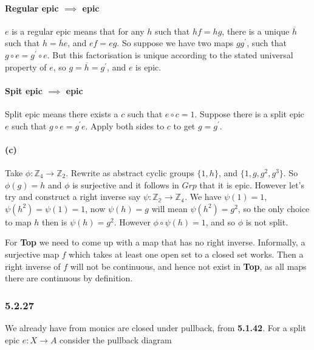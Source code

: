 \documentclass{article}
\begin{document}
\paragraph{Regular epic $\implies$ epic}

$e$ is a regular epic means that for any $h$ such that $hf = hg$, there is a unique $\overline{h}$ such that $h = \overline{h}e$, and $ef = eg$. So suppose we have two maps $g g^\prime$, such that $g\circ e = g^\prime \circ e$. But this factorisation is unique according to the stated universal property of $e$, so $g = \overline{h} = g^\prime$, and $e$ is epic.

\paragraph{Spit epic $\implies$ epic}

Split epic means there exists a $c$ such that $e \circ c=1$. Suppose there is a split epic $e$ such that $g \circ e = g^\prime e$. Apply both sides to $c$ to get $g = g^\prime$.

\paragraph{(c)}

Take $\phi\colon \mathds{Z}_4 \rightarrow \mathds{Z}_2$. Rewrite as abstract cyclic groups $\{1, h\}$, and $\{1, g, g^2, g^3\}$. So $\phi(g)=h$ and $\phi$ is surjective and it follows in $Grp$ that it is epic. However let's try and construct a right inverse say $\psi: \mathds{Z_2} \rightarrow \mathds{Z_4}$. We have $\psi(1)=1$, $\psi(h^2)=\psi(1)=1$, now $\psi(h)=g$ will mean $\psi(h^2) = g^2$, so the only choice to map $h$ then is $\psi(h)=g^2$.  However $\phi \circ \psi (h) = 1$, and so $\phi$ is not split.

For \textbf{Top} we need to come up with a map that has no right inverse. Informally, a surjective map $f$ which takes at least one open set to a closed set works. Then a right inverse of $f$ will not be continuous, and hence not exist in \textbf{Top}, as all maps there are continuous by definition.

\subsubsection*{5.2.27}

We already have from monics are closed under pullback, from \textbf{5.1.42}. For a split epic $e\colon X \rightarrow A$ consider the pullback diagram
\end{document}
